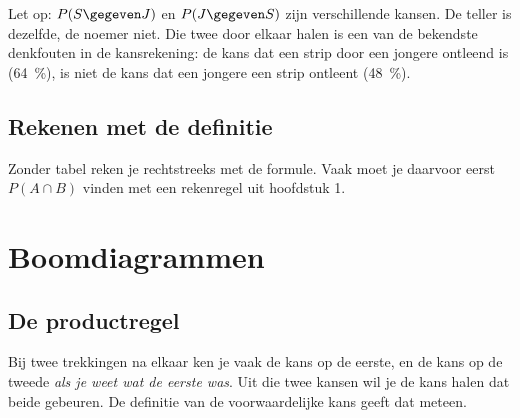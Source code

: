 Let op: $P(S \gegeven J)$ en $P(J \gegeven S)$ zijn verschillende kansen. De teller is dezelfde, de noemer niet. Die twee door elkaar halen is een van de bekendste denkfouten in de kansrekening: de kans dat een strip door een jongere ontleend is (64~\%), is niet de kans dat een jongere een strip ontleent (48~\%).

\begin{oefeningen}
\end{oefeningen}

\subsection{Rekenen met de definitie}

Zonder tabel reken je rechtstreeks met de formule. Vaak moet je daarvoor eerst $P(A \cap B)$ vinden met een rekenregel uit hoofdstuk 1.


\begin{oefeningen}
\end{oefeningen}

\section{Boomdiagrammen}

\subsection{De productregel}

Bij twee trekkingen na elkaar ken je vaak de kans op de eerste, en de kans op de tweede \textit{als je weet wat de eerste was}. Uit die twee kansen wil je de kans halen dat beide gebeuren. De definitie van de voorwaardelijke kans geeft dat meteen.

